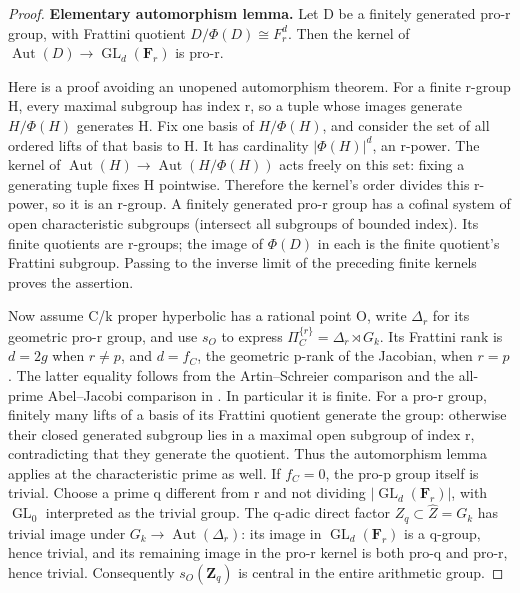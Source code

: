 \begin{proof}

\textbf{Elementary automorphism lemma.} Let D be a finitely generated pro-r group, with Frattini quotient \(D/\Phi(D)\cong F_r^d\). Then the kernel of \(\operatorname{Aut}(D){\to}\operatorname{GL}_d(\mathbf{F}_r)\) is pro-r.

Here is a proof avoiding an unopened automorphism theorem. For a finite r-group H, every maximal subgroup has index r, so a tuple whose images generate \(H/{\Phi}(H)\) generates H. Fix one basis of \(H/{\Phi}(H)\), and consider the set of all ordered lifts of that basis to H. It has cardinality \(|{\Phi}(H)|^d\), an r-power. The kernel of \(\operatorname{Aut}(H){\to}\operatorname{Aut}(H/{\Phi}(H))\) acts freely on this set: fixing a generating tuple fixes H pointwise. Therefore the kernel's order divides this r-power, so it is an r-group. A finitely generated pro-r group has a cofinal system of open characteristic subgroups (intersect all subgroups of bounded index). Its finite quotients are r-groups; the image of \({\Phi}(D)\) in each is the finite quotient's Frattini subgroup. Passing to the inverse limit of the preceding finite kernels proves the assertion.

Now assume C/k proper hyperbolic has a rational point O, write \({\Delta}_r\) for its geometric pro-r group, and use \(s_O\) to express \({\Pi}_C^{\{r\}}={\Delta}_r{\rtimes}G_k\). Its Frattini rank is \(d=2g\) when \(r\ne p\), and \(d=f_C\), the geometric p-rank of the Jacobian, when \(r=p\). The latter equality follows from the Artin--Schreier comparison and the all-prime Abel--Jacobi comparison in \cite[Proposition 9.1 and Lemma 9.4]{MilneJac}. In particular it is finite. For a pro-r group, finitely many lifts of a basis of its Frattini quotient generate the group: otherwise their closed generated subgroup lies in a maximal open subgroup of index r, contradicting that they generate the quotient. Thus the automorphism lemma applies at the characteristic prime as well. If \(f_C=0\), the pro-p group itself is trivial. Choose a prime q different from r and not dividing \(|\operatorname{GL}_d(\mathbf{F}_r)|\), with \(\operatorname{GL}_0\) interpreted as the trivial group. The q-adic direct factor \(Z_q\subset\widehat Z=G_k\) has trivial image under \(G_k{\to}\operatorname{Aut}({\Delta}_r)\): its image in \(\operatorname{GL}_d(\mathbf{F}_r)\) is a q-group, hence trivial, and its remaining image in the pro-r kernel is both pro-q and pro-r, hence trivial. Consequently \(s_O(\mathbf{Z}_q)\) is central in the entire arithmetic group.


\end{proof}
